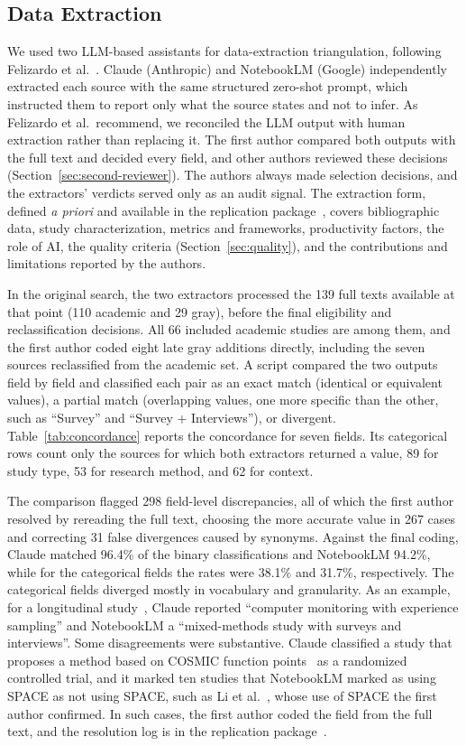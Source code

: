\documentclass[preprint,number]{elsarticle}
\newcounter{study}
\begin{document}
\subsection{Data Extraction}
\label{sec:extraction}

We used two LLM-based assistants for data-extraction triangulation, following Felizardo et al.~\cite{felizardo2024llm}. Claude (Anthropic) and NotebookLM (Google) independently extracted each source with the same structured zero-shot prompt, which instructed them to report only what the source states and not to infer. As Felizardo et al.\ recommend, we reconciled the LLM output with human extraction rather than replacing it. The first author compared both outputs with the full text and decided every field, and other authors reviewed these decisions (Section~\ref{sec:second-reviewer}). The authors always made selection decisions, and the extractors' verdicts served only as an audit signal. The extraction form, defined \textit{a priori} and available in the replication package~\cite{replication2026}, covers bibliographic data, study characterization, metrics and frameworks, productivity factors, the role of AI, the quality criteria (Section~\ref{sec:quality}), and the contributions and limitations reported by the authors.

In the original search, the two extractors processed the 139 full texts available at that point (110 academic and 29 gray), before the final eligibility and reclassification decisions. All 66 included academic studies are among them, and the first author coded eight late gray additions directly, including the seven sources reclassified from the academic set. A script compared the two outputs field by field and classified each pair as an exact match (identical or equivalent values), a partial match (overlapping values, one more specific than the other, such as ``Survey'' and ``Survey + Interviews''), or divergent. Table~\ref{tab:concordance} reports the concordance for seven fields. Its categorical rows count only the sources for which both extractors returned a value, 89 for study type, 53 for research method, and 62 for context. 

The comparison flagged 298 field-level discrepancies, all of which the first author resolved by rereading the full text, choosing the more accurate value in 267 cases and correcting 31 false divergences caused by synonyms. Against the final coding, Claude matched 96.4\% of the binary classifications and NotebookLM 94.2\%, while for the categorical fields the rates were 38.1\% and 31.7\%, respectively. The categorical fields diverged mostly in vocabulary and granularity. As an example, for a longitudinal study~\cite{P0485}, Claude reported ``computer monitoring with experience sampling'' and NotebookLM a ``mixed-methods study with surveys and interviews''. Some disagreements were substantive. Claude classified a study that proposes a method based on COSMIC function points~\cite{P0030} as a randomized controlled trial, and it marked ten studies that NotebookLM marked as using SPACE as not using SPACE, such as Li et al.~\cite{P1303}, whose use of SPACE the first author confirmed. In such cases, the first author coded the field from the full text, and the resolution log is in the replication package~\cite{replication2026}.
\end{document}
